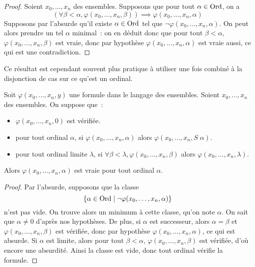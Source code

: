 \begin{proof}
  Soient $x_0,\ldots,x_n$ des ensembles. Supposons que pour tout
  $\alpha\in\operatorname{Ord}$, on a
  \[(\forall \beta < \alpha, \varphi(x_0,\ldots,x_n,\beta))\implies
  \varphi(x_0,\ldots,x_n,\alpha)\]
  Supposons par l'absurde qu'il existe $\alpha \in \operatorname{Ord}$ tel que
  $\lnot\varphi(x_0,\ldots,x_n,\alpha)$. On peut alors prendre un tel $\alpha$
  minimal~: on en déduit donc que pour tout $\beta < \alpha$,
  $\varphi(x_0,\ldots,x_n,\beta)$ est vraie, donc par hypothèse
  $\varphi(x_0,\ldots,x_n,\alpha)$ est vraie aussi, ce qui est une
  contradiction.
\end{proof}

Ce résultat est cependant souvent plus pratique à utiliser une fois combiné à la
disjonction de cas sur ce qu'est un ordinal.

\begin{proposition}
  Soit $\varphi(x_0,\ldots,x_n,y)$ une formule dans le langage des ensembles.
  Soient $x_0,\ldots,x_n$ des ensembles. On suppose que~:
  \begin{itemize}
  \item $\varphi(x_0,\ldots,x_n,0)$ est vérifiée.
  \item pour tout ordinal $\alpha$, si $\varphi(x_0,\ldots,x_n,\alpha)$ alors
    $\varphi(x_0,\ldots,x_n,S\;\alpha)$.
  \item pour tout ordinal limite $\lambda$, si
    $\forall \beta < \lambda, \varphi(x_0,\ldots,x_n,\beta)$ alors
    $\varphi(x_0,\ldots,x_n,\lambda)$.
  \end{itemize}

  Alors $\varphi(x_0,\ldots,x_n,\alpha)$ est vraie pour tout ordinal $\alpha$.
\end{proposition}

\begin{proof}
  Par l'absurde, supposons que la classe
  \[\{\alpha \in\operatorname{Ord}\mid \mathcal \lnot\varphi(x_0,\ldots,x_n,\alpha)\}\]
  n'est pas vide. On trouve alors un minimum à cette classe, qu'on note
  $\alpha$. On sait que $\alpha \neq 0$ d'après nos hypothèses. De plus, si
  $\alpha$ est successeur, alors $\alpha = \beta$ et
  $\varphi(x_0,\ldots,x_n,\beta)$ est vérifiée, donc par hypothèse
  $\varphi(x_0,\ldots,x_n,\alpha)$, ce qui est absurde. Si $\alpha$ est limite,
  alors pour tout $\beta < \alpha$, $\varphi(x_0,\ldots,x_n,\beta)$ est
  vérifiée, d'où encore une absurdité.
  Ainsi la classe est vide, donc tout ordinal vérifie la formule.
\end{proof}

